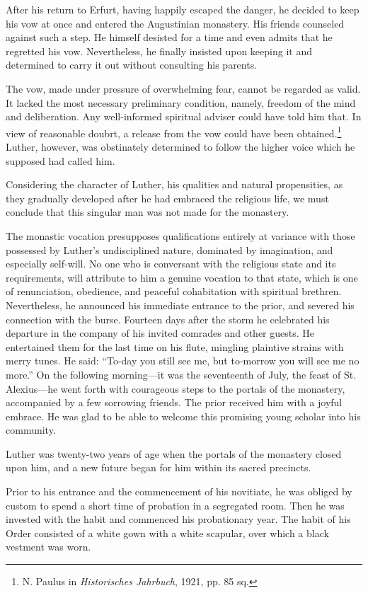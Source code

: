 After his return to Erfurt, having happily escaped the danger,
he decided to keep his vow at once and entered the Augustinian
monastery. His friends counseled against such a step. He himself
desisted for a time and even admits that he regretted his vow. Nevertheless, he finally insisted upon keeping it and determined to carry it
out without consulting his parents.

The vow, made under pressure of overwhelming fear, cannot be
regarded as valid. It lacked the most necessary preliminary condition,
namely, freedom of the mind and deliberation. Any well-informed
spiritual adviser could have told him that. In view of reasonable doubrt,
a release from the vow could have been obtained.\footnote
{N. Paulus in \textit{Historisches Jahrbuch}, 1921, pp. 85 sq.}
Luther, however, was obstinately determined to follow the higher voice which he supposed had called him.

Considering the character of Luther, his qualities and natural
propensities, as they gradually developed after he had embraced the
religious life, we must conclude that this singular man was not made
for the monastery.

The monastic vocation presupposes qualifications entirely at variance with
those possessed by Luther’s undisciplined nature, dominated
by imagination, and especially self-will. No one who is conversant
with the religious state and its requirements, will attribute to him
a genuine vocation to that state, which is one of renunciation,
obedience, and peaceful cohabitation with spiritual brethren.
Nevertheless, he announced his immediate entrance to the prior, and
severed his connection with the burse. Fourteen days after the storm
he celebrated his departure in the company of his invited comrades
and other guests. He entertained them for the last time on his flute,
mingling plaintive strains with merry tunes. He said: “To-day you
still see me, but to-morrow you will see me no more.” On the following
morning—it was the seventeenth of July, the feast of St.
Alexius—he went forth with courageous steps to the portals of the
monastery, accompanied by a few sorrowing friends. The prior received
him with a joyful embrace. He was glad to be able to welcome
this promising young scholar into his community.

Luther was twenty-two years of age when the portals of the
monastery closed upon him, and a new future began for him within
its sacred precincts.

Prior to his entrance and the commencement of his novitiate, he
was obliged by custom to spend a short time of probation in a
segregated room. Then he was invested with the habit and commenced
his probationary year. The habit of his Order consisted of a white
gown with a white scapular, over which a black vestment was worn.

